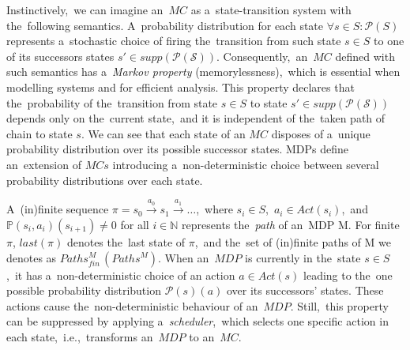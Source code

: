 Instinctively,~we can imagine an~$MC$ as a~state-transition system with the~following semantics.
A~probability distribution for each state $\forall s \in S: \mathcal{P}(S)$ represents a~stochastic choice of firing the~transition from such state $s \in S$ to one of its successors states $s' \in supp(\mathcal{P(S)})$.
Consequently,~an~$MC$ defined with such semantics has a~\textit{Markov property} (memorylessness),~which is essential when modelling systems and for efficient analysis.
This property declares that the~probability of the~transition from state $s \in S$ to state $s' \in supp(\mathcal{P(S)})$ depends only on the~current state,~and it is independent of the~taken path of chain to state $s$.
We can see that each state of an $MC$ disposes of a~unique probability distribution over its possible successor states.
MDPs define an~extension of $MCs$ introducing a~non-deterministic choice between several probability distributions over each state.

A~(in)finite sequence $\pi = s_0 \overset{a_0}{\rightarrow} s_1 \overset{a_1}{\rightarrow} \dots$,~where $s_i \in S$,~$a_i \in Act(s_i)$,~and $\mathbb{P}(s_i, a_i)(s_{i+1}) \neq 0$ for all $i \in \mathbb{N}$ represents the~\textit{path} of an~MDP M.
For finite $\pi$, $last(\pi)$ denotes the~last state of $\pi$,~and the~set of (in)finite paths of M we denotes as $Paths_{fin}^{M}\,(Paths^M)$.
When an~$MDP$ is currently in the~state $s \in S$,~it has a~non-deterministic choice of an action $a \in Act(s)$ leading to the~one possible probability distribution $\mathcal{P}(s)(a)$ over its successors' states.
These actions cause the~non-deterministic behaviour of an~$MDP$.
Still,~this property can be suppressed by applying a~\textit{scheduler},~which selects one specific action in each state,~i.e.,~transforms an~$MDP$ to an~$MC$.



